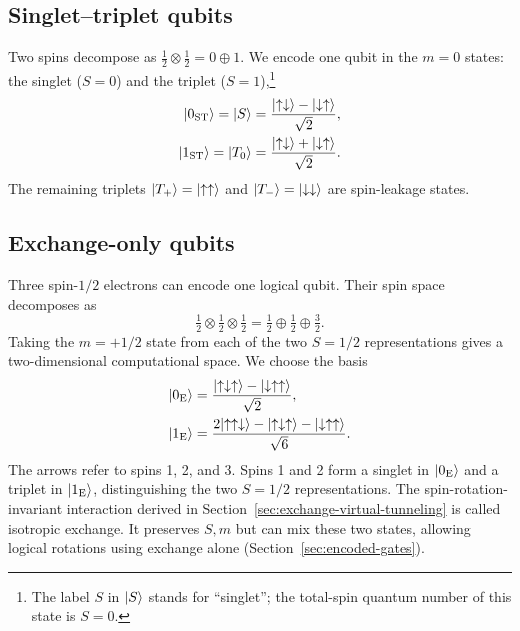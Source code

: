 \subsection{Singlet--triplet qubits}
\label{sec:singlet-triplet-qubits}

Two spins decompose as $\tfrac12\otimes\tfrac12=0\oplus1$.
We encode one qubit in the $m=0$ states: the singlet ($S=0$) and
the triplet ($S=1$),\footnote{The label $S$ in $\lvert S\rangle$ stands for
``singlet''; the total-spin quantum number of this state is $S=0$.}
\begin{equation}
  \begin{aligned}
    \ket{0_{\mathrm{ST}}}=\ket{S}
      &=\frac{\ket{\uparrow\downarrow}-\ket{\downarrow\uparrow}}{\sqrt{2}},\\
    \ket{1_{\mathrm{ST}}}=\ket{T_0}
      &=\frac{\ket{\uparrow\downarrow}+\ket{\downarrow\uparrow}}{\sqrt{2}}.
  \end{aligned}
  \label{eq:st-basis}
\end{equation}
The remaining triplets
$\lvert T_+\rangle=\lvert \uparrow\uparrow\rangle$ and
$\lvert T_-\rangle=\lvert \downarrow\downarrow\rangle$ are spin-leakage states.

\subsection{Exchange-only qubits}
\label{sec:exchange-only-qubits}

Three spin-$1/2$ electrons can encode one logical qubit. Their spin
space decomposes as
\[
 \tfrac12\otimes\tfrac12\otimes\tfrac12
   =\tfrac12\oplus\tfrac12\oplus\tfrac32.
\]
Taking the $m=+1/2$ state from each of the two $S=1/2$
representations gives a two-dimensional computational space.
We choose the basis
\begin{equation}
  \begin{aligned}
    \ket{0_{\mathrm E}}&=
       \frac{\ket{\uparrow\downarrow\uparrow}
             -\ket{\downarrow\uparrow\uparrow}}{\sqrt{2}},\\
    \ket{1_{\mathrm E}}&=
       \frac{2\ket{\uparrow\uparrow\downarrow}
             -\ket{\uparrow\downarrow\uparrow}
             -\ket{\downarrow\uparrow\uparrow}}{\sqrt{6}}.
  \end{aligned}
  \label{eq:exchange-only-basis}
\end{equation}
The arrows refer to spins 1, 2, and 3.
Spins 1 and 2 form a singlet in $\lvert 0_{\mathrm E}\rangle$ and a triplet
in $\lvert 1_{\mathrm E}\rangle$, distinguishing the two $S=1/2$ representations.
The spin-rotation-invariant interaction derived in
Section~\ref{sec:exchange-virtual-tunneling} is called isotropic exchange.
It preserves $S,m$ but can mix these two states, allowing logical
rotations using exchange alone (Section~\ref{sec:encoded-gates}).

